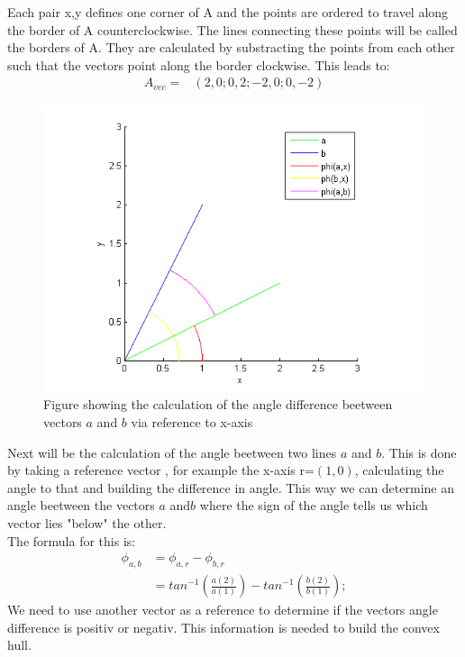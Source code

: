Each pair x,y defines one corner of A and the points are ordered to travel along the border of A counterclockwise.
The lines connecting these points will be called the borders of A. They are calculated by substracting the points from each other such that the vectors point along the border clockwise. This leads to:
\begin{align*}
A_{vec} = 	&( 2 , 0 ; 0 ,2 ;-2, 0; 0, -2)	
\end{align*}

\begin{figure}[H]
\includegraphics{VectorDegree}
\caption{Figure showing the calculation of the angle difference beetween vectors $a$ and $b$ via reference to x-axis}
 \end{figure}

Next will be the calculation of the angle beetween two lines $a$ and $b$. This is done by taking a reference vector , for example the x-axis r=$(1,0)$, calculating the angle to that and building the difference in angle. This way we can determine an angle beetween the vectors $a$ and$b$ where the sign of the angle tells us which vector lies "below" the other.\\
The formula for this is:
\begin{align*}
  \phi_{a,b} &= \phi_{a,r} - \phi_{b,r}\\
	&= tan^{-1} ( \frac{ a(2) }{  a(1) } ) - tan^{-1} ( \frac{b(2)}{b(1)}); 
\end{align*}
We need to use another vector as a reference to determine if the vectors angle difference is positiv or negativ. This information is needed to build the convex hull.

